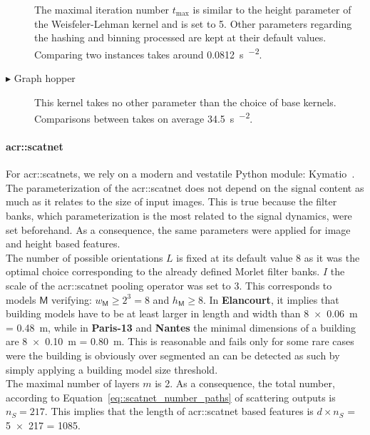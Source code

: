 \begin{description}
                                The maximal iteration number \(t_{\max}\) is similar to the height parameter of the Weisfeler-Lehman kernel and is set to 5.
                                Other parameters regarding the hashing and binning processed are kept at their default values.
                                Comparing two instances takes around \SI{0.0812}{\s\per\building\squared}.
                    \item[\(\blacktriangleright\) Graph hopper] This kernel takes no other parameter than the choice of base kernels.
                                Comparisons between takes on average \SI{34.5}{\s\per\building\squared}.
                \end{description}

            \paragraph{\gls*{acr::scatnet}}
                For \glspl{acr::scatnet}, we rely on a modern and vestatile Python module: Kymatio~\parencite{andreux2018kymatio}.
                The parameterization of the \gls{acr::scatnet} does not depend on the signal content as much as it relates to the size of input images.
                This is true because the filter banks, which parameterization is the most related to the signal dynamics, were set beforehand.
                As a consequence, the same parameters were applied for image and height based features.\\

                The number of possible orientations \(L\) is fixed at its default value 8 as it was the optimal choice corresponding to the already defined Morlet filter banks.
                \(I\) the scale of the \gls{acr::scatnet} pooling operator was set to 3.
                This corresponds to models \(\mathsf{M}\) verifying: \(w_{\mathsf{M}} \geq 2^3 = 8\) and \(h_{\mathsf{M}} \geq 8\).
                In \textbf{Elancourt}, it implies that building models have to be at least larger in length and width than \SI{8 x 0.06}{\m} = \SI{0.48}{\m}, while in \textbf{Paris-13} and \textbf{Nantes} the minimal dimensions of a building are \SI{8 x 0.10}{\m} = \SI{0.80}{\m}.
                This is reasonable and fails only for some rare cases were the building is obviously over segmented an can be detected as such by simply applying a building model size threshold.\\
                The maximal number of layers \(m\) is 2.
                As a consequence, the total number, according to Equation~\ref{eq::scatnet_number_paths} of scattering outputs is \(n_S = 217\).
                This implies that the length of \gls{acr::scatnet} based features is \(d \times n_S\) = \num{5 x 217} = 1085.\\

